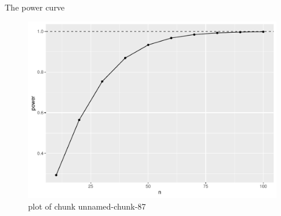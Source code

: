 \documentclass[ignorenonframetext,]{beamer}
\begin{document}
\begin{frame}[fragile]{The power curve}
\begin{figure}
\centering
\includegraphics{figure/unnamed-chunk-87-1.pdf}
\caption{plot of chunk unnamed-chunk-87}
\end{figure}

\end{frame}
\end{document}

